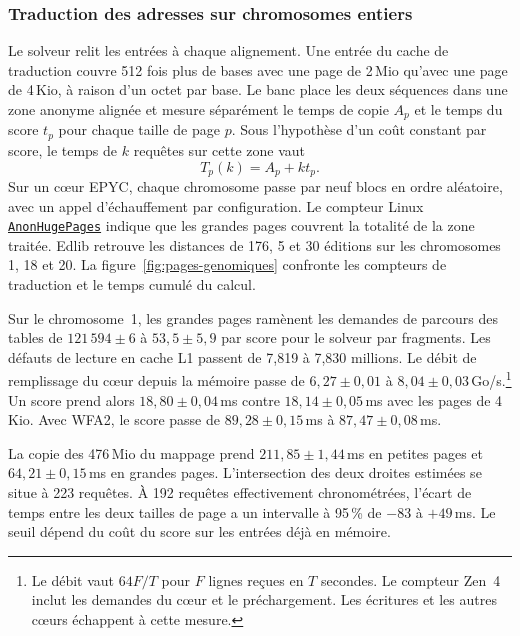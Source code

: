 \subsubsection{Traduction des adresses sur chromosomes entiers}\label{sec:pages-genomiques}
Le solveur relit les entrées à chaque alignement. Une entrée du cache de traduction couvre 512 fois plus de bases avec une page de 2\,Mio qu'avec une page de 4\,Kio, à raison d'un octet par base. Le banc place les deux séquences dans une zone anonyme alignée et mesure séparément le temps de copie \(A_p\) et le temps du score \(t_p\) pour chaque taille de page \(p\). Sous l'hypothèse d'un coût constant par score, le temps de \(k\) requêtes sur cette zone vaut
\[
                T_p(k)=A_p+k t_p .
\]
Sur un cœur EPYC, chaque chromosome passe par neuf blocs en ordre aléatoire, avec un appel d'échauffement par configuration. Le compteur Linux \href{https://docs.kernel.org/admin-guide/mm/transhuge.html}{\texttt{AnonHugePages}} indique que les grandes pages couvrent la totalité de la zone traitée. Edlib retrouve les distances de 176, 5 et 30 éditions sur les chromosomes 1, 18 et 20. La figure~\ref{fig:pages-genomiques} confronte les compteurs de traduction et le temps cumulé du calcul.

Sur le chromosome~1, les grandes pages ramènent les demandes de parcours des tables de \(121\,594\pm6\) à \(53{,}5\pm5{,}9\) par score pour le solveur par fragments. Les défauts de lecture en cache L1 passent de 7,819 à 7,830 millions. Le débit de remplissage du cœur depuis la mémoire passe de \(6{,}27\pm0{,}01\) à \(8{,}04\pm0{,}03\)\,Go/s.\footnote{Le débit vaut \(64F/T\) pour \(F\) lignes reçues en \(T\) secondes. Le compteur Zen~4 inclut les demandes du cœur et le préchargement. Les écritures et les autres cœurs échappent à cette mesure.} Un score prend alors \(18{,}80\pm0{,}04\)\,ms contre \(18{,}14\pm0{,}05\)\,ms avec les pages de 4\,Kio. Avec WFA2, le score passe de \mbox{\(89{,}28\pm0{,}15\)\,ms} à \mbox{\(87{,}47\pm0{,}08\)\,ms}.

La copie des 476\,Mio du mappage prend \(211{,}85\pm1{,}44\)\,ms en petites pages et \(64{,}21\pm0{,}15\)\,ms en grandes pages. L'intersection des deux droites estimées se situe à 223 requêtes. À 192 requêtes effectivement chronométrées, l'écart de temps entre les deux tailles de page a un intervalle à 95\,\% de \(-83\) à \(+49\)\,ms. Le seuil dépend du coût du score sur les entrées déjà en mémoire.

